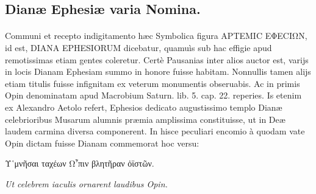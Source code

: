 \documentclass[a4paper, 11pt, oneside, polutonikogreek, latin]{article}
\begin{document}
\subsection{Dianæ Ephesiæ varia Nomina.}
\paragraph{}
Communi et recepto indigitamento hæc Symbolica figura ΑΡΤΕΜΙC ΕΦΕCΙΩΝ, id est, DIANA EPHESIORUM dicebatur, quamuìs sub hac effigie apud remotissimas etiam gentes coleretur. Certè Pausanias inter alios auctor est, varijs in locis Dianam Ephesiam summo in honore fuisse habitam. Nonnullis tamen alijs etiam titulis fuisse infignitam ex veterum monumentis obseruabis. Ac in primis Opin denominatam apud Macrobium Saturn. lib. 5. cap. 22. reperies. Is etenim ex Alexandro Aetolo refert, Ephesios dedicato augustissimo templo Dianæ celebrioribus Musarum alumnis præmia amplissima constituisse, ut in Deæ laudem carmina diversa componerent. In hisce peculiari encomio à quodam vate Opin dictam fuisse Dianam commemorat hoc versu:

Υ῾μνῆσαι ταχέων Ω῏πιν βλητῆραν ὀϊστῶν.

\emph{Ut celebrem iaculis ornarent laudibus Opin.}
 
\end{document}
